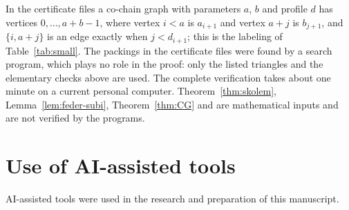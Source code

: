 \documentclass{amsart}
\theoremstyle{definition}
\theoremstyle{remark}
\numberwithin{equation}{section}
\numberwithin{table}{section}
\begin{document}
In the certificate files a co-chain graph with parameters $a$, $b$ and profile $d$ has vertices $0,\dots,a+b-1$, where vertex $i<a$ is $a_{i+1}$ and vertex $a+j$ is $b_{j+1}$, and $\{i,a+j\}$ is an edge exactly when $j<d_{i+1}$; this is the labeling of Table~\ref{tab:small}. The packings in the certificate files were found by a search program, which plays no role in the proof: only the listed triangles and the elementary checks above are used. The complete verification takes about one minute on a current personal computer. Theorem~\ref{thm:skolem}, Lemma~\ref{lem:feder-subi}, Theorem~\ref{thm:CG} and \cite[Theorem~3.4]{BFG} are mathematical inputs and are not verified by the programs.

\section*{Use of AI-assisted tools}
AI-assisted tools were used in the research and preparation of this manuscript.
\end{document}
